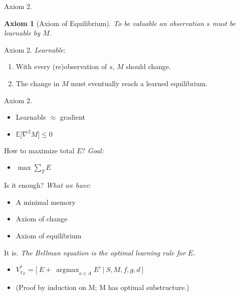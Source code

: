 \documentclass[10pt]{beamer}
\DeclareMathOperator*{\argmax}{argmax}
\newtheorem{axiom}{Axiom}
\begin{document}
\begin{frame}[fragile]{Axiom 2.}
\begin{axiom}
	[Axiom of Equilibrium] To be valuable an observation $s$ must be learnable by $M$. 
\label{ax:5} 
\end{axiom}
\end{frame}

\begin{frame}[fragile]{Axiom 2.}
\textit{Learnable}: 
\begin{enumerate}
    \item With every (re)observation of $s$, $M$ should change.
    \item The change in $M$ must eventually reach a learned equilibrium. 
\end{enumerate}
\end{frame}

\begin{frame}[fragile]{Axiom 2.}
\begin{itemize}
\item Learnable $\approx$ gradient
\item $\mathbb{E}\big [\nabla^2 M \big ] \leq 0$
\end{itemize}
\end{frame}

\begin{frame}[fragile]{How to maximize total $E$?}
\textit{Goal:}
\begin{itemize}
\item $\max \sum_T E$
\end{itemize}
\end{frame}

\begin{frame}[fragile]{Is it enough?}
\textit{What we have}:
\begin{itemize}
\item A minimal memory
\item Axiom of change
\item Axiom of equilibrium
\end{itemize}
\end{frame}

\begin{frame}[fragile]{It is.}
\textit{The Bellman equation is the optimal learning rule for $E$.}
\begin{itemize}
\item $V^*_{\pi_{E}} = \Big [\ E + \ \argmax_{a \in A} E'\ \Big |\ S, M, f, g, d \ \Big ]$
\item (Proof by induction on M; M has optimal substructure.)
\end{itemize}
\end{frame}
\end{document}
